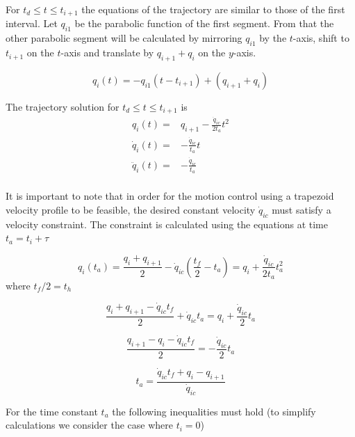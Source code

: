 For $t_d \leq t \leq t_{i+1}$ the equations of the trajectory are similar to those of the first interval. Let $q_{i1}$ be the parabolic function of the first segment. From that the other 
parabolic segment will be calculated by mirroring $q_{i1}$ by the $t$-axis, shift to $t_{i+1}$ on the $t$-axis and translate by $q_{i+1} + q_i$ on the $y$-axis.

\begin{equation}
q_i(t) = -q_{i1}(t-t_{i+1}) + (q_{i+1} + q_i)
\end{equation}

The trajectory solution for $t_d \leq t \leq t_{i+1}$ is
\begin{equation}
\begin{aligned}
q_i(t) ={}& q_{i+1} - \frac{\dot{q}_{ic}}{2t_a}t^2 \\
\dot{q}_i(t) ={}& -\frac{\dot{q}_{ic}}{t_a}t \\
\ddot{q}_i(t) ={}& -\frac{\dot{q}_{ic}}{t_a} \\
\end{aligned}
\end{equation}

It is important to note that in order for the motion control using a trapezoid velocity profile to be feasible, the desired constant velocity $\dot{q}_{ic}$ must satisfy a velocity constraint. The constraint is 
calculated using the equations at time $t_a = t_i + τ$

\begin{equation}
q_i(t_a) = \frac{q_i + q_{i+1}}{2} - \dot{q}_{ic} \left( \frac{t_f}{2} - t_a \right) = q_i + \frac{\dot{q}_{ic}}{2t_a}t_a^2
\end{equation}
where $t_f/2 = t_h$

\begin{equation}
\frac{q_i + q_{i+1} - \dot{q}_{ic}t_f}{2} + \dot{q}_{ic}t_a = q_i + \frac{\dot{q}_{ic}}{2}t_a
\end{equation}

\begin{equation}
\frac{q_{i+1} - q_i - \dot{q}_{ic}t_f}{2} = -\frac{\dot{q}_{ic}}{2}t_a
\end{equation}

\begin{equation}
\label{eq:ta}
t_a = \frac{\dot{q}_{ic}t_f + q_i - q_{i+1}}{\dot{q}_{ic}}
\end{equation}

For the time constant $t_a$ the following inequalities must hold (to simplify calculations we consider the case where $t_i = 0$)

